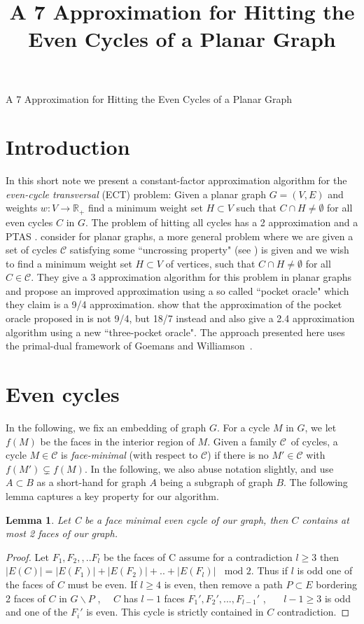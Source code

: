 \documentclass[letterpaper,11pt]{article}
\title{A 7 Approximation for Hitting the Even Cycles of a Planar Graph}
\newtheorem{lemma}[theorem]{Lemma}
\newcommand{\CC}{{\ensuremath{\mathcal C}}}
\newcommand{\0}{\mathbb{0}}
\newcommand{\1}{\mathbb{1}}
\begin{document}
\begin{Large}
\begin{center}
    A 7 Approximation for Hitting the Even Cycles of a Planar Graph
\end{center}
\end{Large}

\section{Introduction}
In this short note we present a constant-factor approximation algorithm for the {\em even-cycle transversal} (ECT) problem:
Given a planar graph $G=(V,E)$ and weights $w:V \rightarrow \mathbb{R}_+$ find a minimum weight set $H \subset V$ such that $C \cap H \neq \emptyset$ for all even cycles $C$ in $G$.   
The problem of hitting all cycles has a 2 approximation \cite{Becker2apx}   and a PTAS \cite{Fomin2010} .   \cite{GW98}  consider for planar graphs, a  more general problem where we are given a set of  cycles $\mathcal{C} $ satisfying some ``uncrossing property" (see \cite{GW98} ) is given and we wish to find a minimum weight set $H \subset V$ of vertices, such that  $C \cap H \neq \emptyset $   for all $C \in \mathcal{C}$.  They give a 3 approximation algorithm for this problem in planar graphs and propose an improved approximation using a so called ``pocket oracle" which they claim is a 9/4 approximation.   \cite{BY12}   show that the approximation of the pocket oracle proposed in \cite{GW98} is not 9/4, but 18/7 instead and also give a 2.4  approximation algorithm using a new ``three-pocket oracle".
The approach presented here uses the primal-dual framework of Goemans and Williamson~\cite{GW97,GW98}.

\section{Even cycles}

In the following, we fix an embedding of graph $G$. For a cycle $M$ in $G$, we let $f(M)$ be the faces in the interior region of $M$. Given a family \CC\ of cycles, a cycle $M \in \CC$ is {\em face-minimal} (with respect to \CC) if there is no $M' \in \CC$ with $f(M') \subsetneq f(M)$.
In the following, we also abuse notation slightly,
and use $A \subset B$ as a short-hand for graph $A$ being a subgraph of graph $B$. The following lemma captures a key property for our algorithm.

\begin{lemma}
Let C be a face minimal even cycle of our graph, then $C$ contains at most 2 faces of our graph.  
\end{lemma}
\begin{proof}
Let $F_1, F_2 ,,.. F_l$ be the faces of C assume for a contradiction $l \geq 3$ then $ |E(C)| = |E(F_1)|+|E(F_2)|+..+|E(F_l)| \ \ \ \ \text{mod \ \ 2} $.  Thus if $l$ is odd one of the faces of $C$ must be even. If $l \geq 4$ is even, then remove a path $P \subset E $ bordering 2 faces of $C$ in $G \backslash P$ , \ \ $C$ has $l-1$ faces $ F_1', F_2' ,... , F_{l-1}' $ , \ \ \ $l-1 \geq 3 $ is odd and one of the $F_i'$ is even. This cycle is strictly contained in $C$ contradiction.
\end{proof} 
\end{document}
